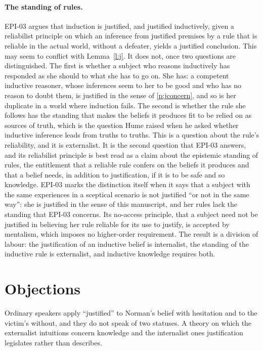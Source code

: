 \documentclass{situationist-preprint}
\begin{document}
\paragraph{The standing of rules.} EPI-03 argues that induction is justified, and justified inductively, given a reliabilist principle on which an inference from justified premises by a rule that is reliable in the actual world, without a defeater, yields a justified conclusion. This may seem to conflict with Lemma~\ref{l:j}. It does not, once two questions are distinguished. The first is whether a subject who reasons inductively has responded as she should to what she has to go on. She has: a competent inductive reasoner, whose inferences seem to her to be good and who has no reason to doubt them, is justified in the sense of \ref{p:jconcern}, and so is her duplicate in a world where induction fails. The second is whether the rule she follows has the standing that makes the beliefs it produces fit to be relied on as sources of truth, which is the question Hume raised when he asked whether inductive inference leads from truths to truths. This is a question about the rule's reliability, and it is externalist. It is the second question that EPI-03 answers, and its reliabilist principle is best read as a claim about the epistemic standing of rules, the entitlement that a reliable rule confers on the beliefs it produces and that a belief needs, in addition to justification, if it is to be safe and so knowledge. EPI-03 marks the distinction itself when it says that a subject with the same experiences in a sceptical scenario is not justified \enquote{or not in the same way}: she is justified in the sense of this manuscript, and her rules lack the standing that EPI-03 concerns. Its no-access principle, that a subject need not be justified in believing her rule reliable for its use to justify, is accepted by mentalism, which imposes no higher-order requirement. The result is a division of labour: the justification of an inductive belief is internalist, the standing of the inductive rule is externalist, and inductive knowledge requires both.

\section{Objections}

\begin{objection}
Ordinary speakers apply \enquote{justified} to Norman's belief with hesitation and to the victim's without, and they do not speak of two statuses. A theory on which the externalist intuitions concern knowledge and the internalist ones justification legislates rather than describes.
\end{objection}
\end{document}
